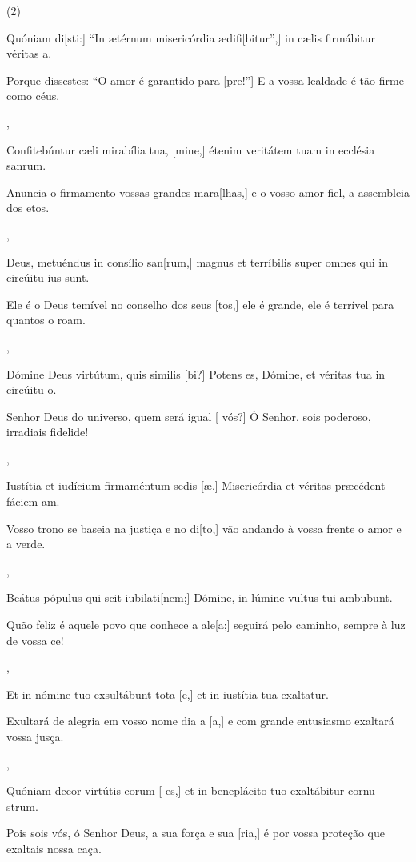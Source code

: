 \SetVersePairs(2){
  {\item {}Quóniam di[sti:] ``In ætérnum misericórdia ædifi[\-bi\-tur'',] in cælis firmábitur véritas a.~\Responsorium}%
    {\item {}Porque dissestes: ``O amor é garantido para [\-pre!''] E a vossa lealdade é tão firme como  céus.~\Responsorium},
  {\item {}Confitebúntur cæli mirabília tua, [mine,] étenim veritátem tuam in ecclésia san\-rum.~\Responsorium}%
    {\item {}Anuncia o firmamento vossas grandes mara[lhas,] e o vosso amor fiel, a assembleia dos etos.~\Responsorium},
  {\item {}Deus, metuéndus in consílio san[rum,] magnus et terríbilis super omnes qui in circúitu ius sunt.~\Responsorium}%
    {\item {}Ele é o Deus temível no conselho dos seus [tos,] ele é grande, ele é terrível para quantos o roam.~\Responsorium},
  {\item {}Dómine Deus virtútum, quis similis [bi?] Potens es, Dómine, et véritas tua in circúitu o.~\Responsorium}%
    {\item {}Senhor Deus do universo, quem será  igual [ vós?] Ó Senhor, sois poderoso, irradiais fidelide!~\Responsorium},
  {\item {}Iustítia et iudícium firmaméntum sedis [æ.] Misericórdia et véritas præcédent fáciem am.~\Responsorium}%
    {\item {}Vosso trono se baseia na justiça e no di[to,] vão andando à vossa frente  o amor e a verde.~\Responsorium},
  {\item {}Beátus pópulus qui scit iubilati[nem;] Dó\-mi\-ne, in lúmine vultus tui ambubunt.~\Responsorium}%
    {\item {}Quão feliz é aquele povo que conhece a ale[a;] seguirá pelo caminho, sempre à luz de vossa ce!~\Responsorium},
  {\item {}Et in nómine tuo exsultábunt tota [e,] et in iustítia tua exaltatur.~\Responsorium}%
    {\item {}Exultará de alegria em vosso nome dia a [a,] e com grande entusiasmo exaltará vossa jusça.~\Responsorium},
  {\item {}Quóniam decor virtútis eorum [ es,] et in be\-ne\-plácito tuo exaltábitur cornu strum.~\Responsorium}%
    {\item {}Pois sois vós, ó Senhor Deus, a sua força e sua [ria,] é por vossa proteção que exaltais nossa caça.~\Responsorium}
}